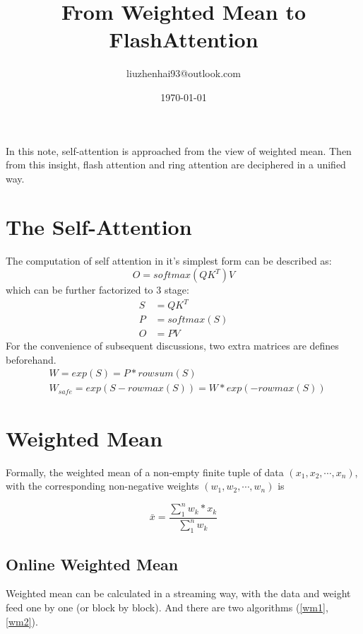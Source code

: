 \documentclass[a4paper]{article}
\title{From Weighted Mean to FlashAttention}
\author{liuzhenhai93@outlook.com}
\date{\today}
\begin{document}
    \maketitle

    In this note, self-attention is approached from the view of weighted mean. Then from this insight, flash attention and ring attention are deciphered in a unified way.

    \section{The Self-Attention}
    \par
    The computation of self attention in it's simplest form can be described as: \newline
    \begin{equation}
        O = softmax(QK^T)V
    \end{equation}
    which can be further factorized to 3 stage: \newline
    \begin{align}
        S &= QK^T \\
        P &= softmax(S) \\
        O &= PV
    \end{align}
    For the convenience of subsequent discussions, two extra matrices are defines beforehand.
    \newline
    \begin{align}
        & W = exp(S) = P* rowsum(S) \\
        & W_{safe} = exp(S-rowmax(S)) = W * exp(-rowmax(S))
    \end{align}


    \section{Weighted Mean}

    Formally, the weighted mean of a non-empty finite tuple of data $(x_1, x_2, \cdots, x_n)$, with the corresponding non-negative weights $(w_1, w_2, \cdots, w_n)$ is \newline

    \begin{equation}
        \bar{x} = \frac{\sum_{1}^{n} w_k*x_k}{\sum_{1}^{n}w_{k}}
    \end{equation}

    \subsection{Online Weighted Mean}
    Weighted mean can be calculated in a streaming way, with the data and weight feed one by one (or block by block).  And there are two algorithms (\ref{wm1}, \ref{wm2}).
\end{document}
